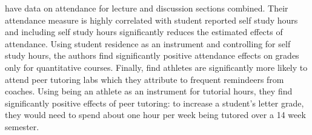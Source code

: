 \documentclass[12pt]{article}
\begin{document}
\textcite{bs2013} have data on attendance for lecture and discussion sections combined.  Their attendance measure is highly correlated with student reported self study hours and including self study hours significantly reduces the estimated effects of attendance.  Using student residence as an instrument and controlling for self study hours, the authors find significantly positive attendance effects on grades only for quantitative courses. Finally, \textcite{mgm2010} find athletes are significantly more likely to attend peer tutoring labs which they attribute to frequent remindeers from coaches.  Using being an athlete as an instrument for tutorial hours, they find significantly positive effects of peer tutoring:  to increase a student's letter grade, they would need to spend about one hour per week being tutored over a 14 week semester.       
\end{document}
